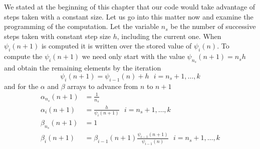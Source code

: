 We stated at the beginning of this chapter that our code would take
advantage of steps taken with a constant size. Let us go into this matter
now and examine the programming of the computation.
Let the variable $n_s$ be the number of successive steps taken with constant 
step size $h$, including the current one. When $\psi _i(n+1)$ is computed it is 
written over the stored value of $\psi _i(n)$.
To compute the $\psi _{i}(n+1)$ we need only start with the value 
$\psi _{n_s}(n+1) = n_s h$ and obtain the remaining elements by the iteration 
\begin{equation}
    \psi _{i}(n+1) = \psi _{i-1}(n) + h \text{ } i= n_s+1 , \dots , k
\end{equation}
and for the $\alpha$ and $\beta$ arrays to advance from $n$ to $n+1$
\begin{equation}
    \begin{aligned}
        \alpha _{n_s} (n+1) &= \frac{1}{n_s} \\
        \alpha _{i} (n+1)   &= \frac{h}{\psi _i(n+1)} \text{ } i= n_s+1, \dots ,k \\
        \beta _{n_s} (n+1)  &= 1 \\
        \beta _{i} (n+1)    &= \beta _{i-1} (n+1) \frac{\psi _{i-1}(n+1)}{\psi _{i-1}(n)} 
            \text{ } i= n_s +1 , \dots ,k
    \end{aligned}
\end{equation}